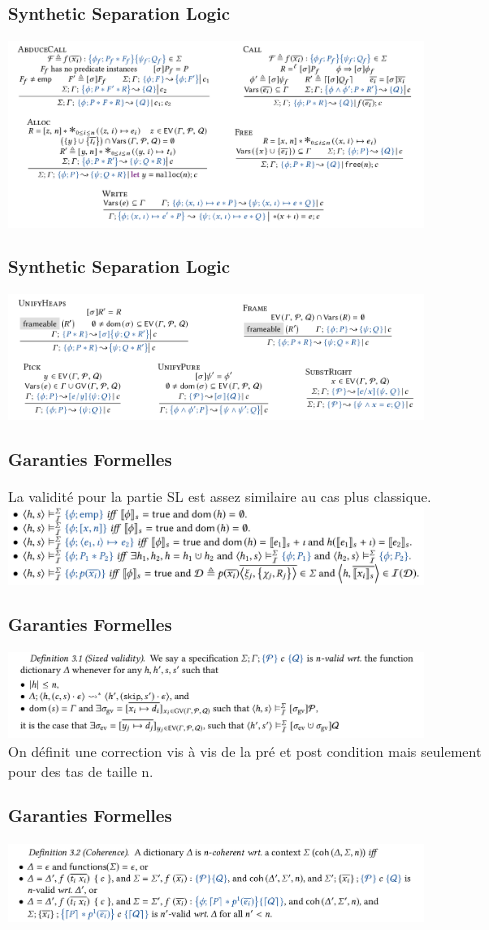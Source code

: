 \documentclass[french]{beamer}
\begin{document}
\begin{frame}[fragile]
	\frametitle{Synthetic Separation Logic}
	\includegraphics[width=11cm]{figures/zoo2.png}
\end{frame}
\begin{frame}[fragile]
	\frametitle{Synthetic Separation Logic}
	\includegraphics[width=11cm]{figures/zoo3.png}
\end{frame}
\begin{frame}[fragile]
	\frametitle{Garanties Formelles}
	La validité pour la partie SL est assez similaire au cas plus classique.\\
	\vspace{0.5cm}
	\includegraphics[width=11cm]{figures/satisfaction.png}
\end{frame}
\begin{frame}[fragile]
	\frametitle{Garanties Formelles}
	\includegraphics[width=11cm]{figures/nvalid.png}\\
	
	On définit une correction vis à vis de la pré et post condition mais seulement pour des tas de taille n.
\end{frame}
\begin{frame}[fragile]
	\frametitle{Garanties Formelles}
	\includegraphics[width=11cm]{figures/coherence.png}
\end{frame}
\end{document}
